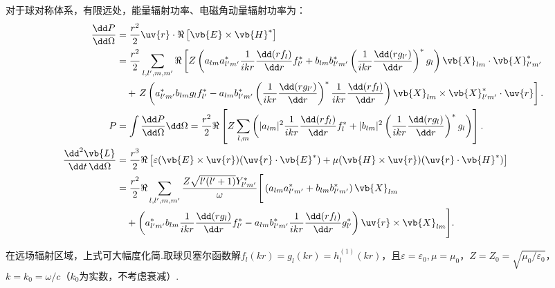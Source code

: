 对于球对称体系，有限远处，能量辐射功率、电磁角动量辐射功率为：
\begin{align*}
	\frac{\dd P}{\dd \Omega} &= \frac{r^2}{2}\uv{r}\cdot\Re\left[\vb{E}\times\vb{H}^*\right] \\
	&= \frac{r^2}{2}\sum_{l,l',m,m'}\Re\left[ Z\left( a_{lm}a_{l'm'}^*\frac{1}{ikr}\frac{\dd(rf_l)}{\dd r}f_{l'}^* + b_{lm}b_{l'm'}^*\left( \frac{1}{ikr}\frac{\dd(rg_{l'})}{\dd r} \right)^*g_l \right)\vb{X}_{lm}\cdot\vb{X}_{l'm'}^* \right. \\
		&\quad + \left. Z\left( a_{l'm'}^*b_{lm}g_lf_{l'}^* - a_{lm}b_{l'm'}^*\left( \frac{1}{ikr}\frac{\dd(rg_{l'})}{\dd r} \right)^*\frac{1}{ikr}\frac{\dd(rf_l)}{\dd r} \right)\vb{X}_{lm}\times\vb{X}_{l'm'}^*\cdot\uv{r} \right] .\\
	P &= \int\frac{\dd P}{\dd \Omega}\dd \Omega = \frac{r^2}{2}\Re\left[ Z\sum_{l,m}\left( |a_{lm}|^2\frac{1}{ikr}\frac{\dd(rf_l)}{\dd r}f_l^* + |b_{lm}|^2\left( \frac{1}{ikr}\frac{\dd(rg_l)}{\dd r} \right)^*g_l \right) \right].\\
	\frac{\dd^2\vb{L}}{\dd t\,\dd \Omega} &= \frac{r^3}{2}\Re\left[ \varepsilon(\vb{E}\times\uv{r})(\uv{r}\cdot\vb{E}^*)+\mu(\vb{H}\times\uv{r})(\uv{r}\cdot\vb{H}^*) \right]\\
	&= \frac{r^2}{2}\Re \sum_{l,l',m,m'}\frac{Z\sqrt{l'(l'+1)}Y_{l'm'}^*}{\omega}\Bigg[\left( a_{lm}a_{l'm'}^* + b_{lm}b_{l'm'}^* \right)\vb{X}_{lm}   \\
		&\quad + \left( a_{l'm'}^*b_{lm}\frac{1}{ikr}\frac{\dd(rg_l)}{\dd r}f_{l'}^* - a_{lm}b_{l'm'}^*\frac{1}{ikr}\frac{\dd(rf_l)}{\dd r}g_{l'}^* \right)\uv{r}\times\vb{X}_{lm}  \Bigg].
\end{align*}

在远场辐射区域，上式可大幅度化简.取球贝塞尔函数解\(f_l(kr)=g_l(kr)=h_l^{(1)}(kr)\)，且\(\varepsilon=\varepsilon_0,\mu=\mu_0\)，\(Z=Z_0=\sqrt{\mu_0/\varepsilon_0}\)，\(k=k_0=\omega/c\)（\(k_0\)为实数，不考虑衰减）.

